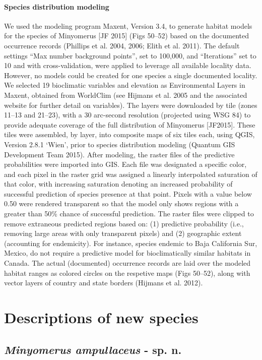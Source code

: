 \documentclass[fleqn,10pt,lineno]{wlpeerj} %
\begin{document}
	\paragraph{Species distribution modeling}
		We used the modeling program Maxent, Version 3.4, to generate habitat models for the species of Minyomerus [JF 2015] (Figs 50–52) based on the documented occurrence records (Phillips et al. 2004, 2006; Elith et al. 2011).
		The default settings “Max number background points”, set to 100,000, and “Iterations” set to 10 and with cross-validation, were applied to leverage all available locality data.
		However, no models could be created for one species a single documented locality.
		We selected 19 bioclimatic variables and elevation as Environmental Layers in Maxent, obtained from WorldClim (see Hijmans et al. 2005 and the associated website for further detail on variables).
		The layers were downloaded by tile (zones 11–13 and 21–23), with a 30 arc-second resolution (projected using WSG 84) to provide adequate coverage of the full distribution of Minyomerus [JF2015].
		These tiles were assembled, by layer, into composite maps of six tiles each, using QGIS, Version 2.8.1 ‘Wien’, prior to species distribution modeling (Quantum GIS Development Team 2015).
		After modeling, the raster files of the predictive probabilities were imported into GIS.
		Each file was designated a specific color, and each pixel in the raster grid was assigned a linearly interpolated saturation of that color, with increasing saturation denoting an increased probability of successful prediction of species presence at that point.
		Pixels with a value below 0.50 were rendered transparent so that the model only shows regions with a greater than 50\% chance of successful prediction.
		The raster files were clipped to remove extraneous predicted regions based on: (1) predictive probability (i.e., removing large areas with only transparent pixels) and (2) geographic extent (accounting for endemicity).
		For instance, species endemic to Baja California Sur, Mexico, do not require a predictive model for bioclimatically similar habitats in Canada.
		The actual (documented) occurrence records are laid over the modeled habitat ranges as colored circles on the respetive maps (Figs 50–52), along with vector layers of country and state borders (Hijmans et al. 2012).
\section*{Descriptions of new species}
	\subsection*{\textit{Minyomerus ampullaceus} - sp. n.}
\end{document}
